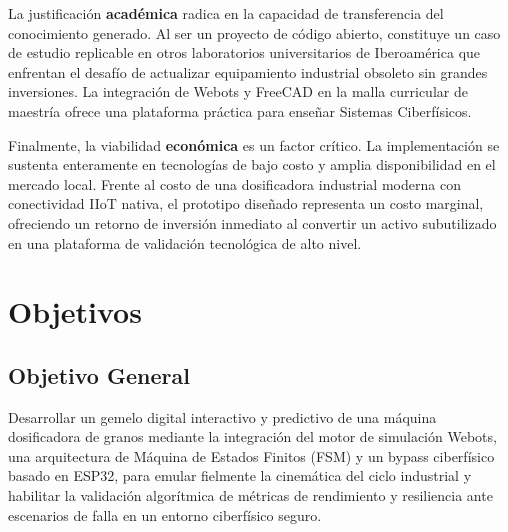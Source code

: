 La justificación \textbf{académica} radica en la capacidad de transferencia del conocimiento generado. Al ser un proyecto de código abierto, constituye un caso de estudio replicable en otros laboratorios universitarios de Iberoamérica que enfrentan el desafío de actualizar equipamiento industrial obsoleto sin grandes inversiones. La integración de Webots y FreeCAD en la malla curricular de maestría ofrece una plataforma práctica para enseñar Sistemas Ciberfísicos.

Finalmente, la viabilidad \textbf{económica} es un factor crítico. La implementación se sustenta enteramente en tecnologías de bajo costo y amplia disponibilidad en el mercado local. Frente al costo de una dosificadora industrial moderna con conectividad IIoT nativa, el prototipo diseñado representa un costo marginal, ofreciendo un retorno de inversión inmediato al convertir un activo subutilizado en una plataforma de validación tecnológica de alto nivel.

\section{Objetivos}

\subsection{Objetivo General}
Desarrollar un gemelo digital interactivo y predictivo de una máquina dosificadora de granos mediante la integración del motor de simulación Webots, una arquitectura de Máquina de Estados Finitos (FSM) y un bypass ciberfísico basado en ESP32, para emular fielmente la cinemática del ciclo industrial y habilitar la validación algorítmica de métricas de rendimiento y resiliencia ante escenarios de falla en un entorno ciberfísico seguro.

